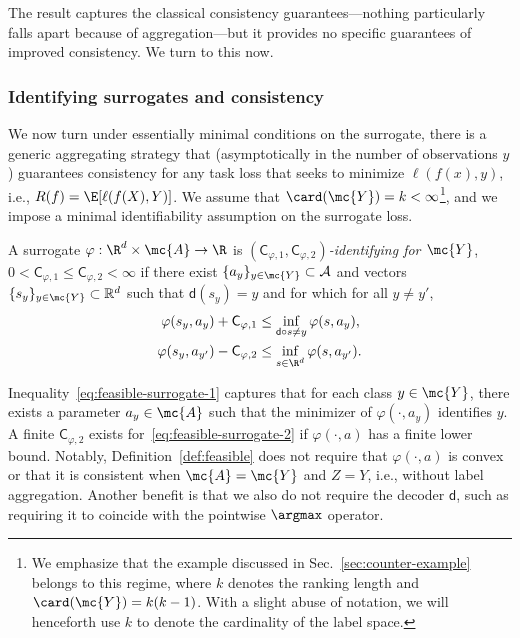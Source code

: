 \documentclass[11pt]{article}
\newcommand{\real}{\mathbb{R}} %
\newcommand{\constant}{\mathsf{C}}  %
\newcommand{\pred}{\mathsf{d}}  %
\newcommand{\tloss}{\ell}  %
\newcommand{\sloss}{\varphi}  %
\begin{document}
The result captures the classical consistency guarantees---nothing
particularly falls apart because of aggregation---but it provides no
specific guarantees of improved consistency.
%
We turn to this now.

\subsubsection{Identifying surrogates and consistency}

We now turn under essentially minimal conditions on the surrogate, there is
a generic aggregating strategy that (asymptotically in the number of
observations $y$) guarantees consistency for any task loss that seeks to
minimize $\tloss(f(x), y)$, i.e.,
$R(f) = \E[\tloss(f(X), Y)]$.
%
We assume that $\card(\mc{Y}) = k < \infty$\footnote{We emphasize that the example discussed in Sec.~\ref{sec:counter-example} belongs to this regime, where $k$ denotes the ranking length and $\card(\mc{Y}) = k(k-1)$. With a slight abuse of notation, we will henceforth use $k$ to denote the cardinality of the label space.},
and we impose a minimal identifiability assumption on the surrogate
loss.

\begin{definition}
  \label{def:feasible}
  A surrogate $\sloss : \R^d \times \mc{A} \to \R$ is
  \emph{$(\constant_{\sloss, 1}, \constant_{\sloss, 2})$-identifying
  for $\mc{Y}$},
  $0 < \constant_{\sloss,1} \le \constant_{\sloss,2} < \infty$
  if there exist
  $\{a_y\}_{y \in \mc{Y}} \subset \mathcal{A}$ and
  vectors $\{s_y\}_{y \in \mc{Y}} \subset \real^d$ such that
  $\pred(s_y) = y$ and for which for all $y \neq y'$,
  \begin{subequations}
    \begin{align}
      \sloss(s_y, a_y) + \constant_{\sloss, 1}
      & \leq \inf_{\pred \circ s \neq y} \sloss(s, a_y),
      \label{eq:feasible-surrogate-1} \\
      \sloss(s_y, a_{y'}) - \constant_{\sloss, 2}
      & \leq \inf_{s \in \R^d} \sloss(s, a_{y'}). \label{eq:feasible-surrogate-2}
    \end{align}
  \end{subequations}
\end{definition}
\noindent
Inequality~\eqref{eq:feasible-surrogate-1} captures
that for each class $y \in \mc{Y}$,
there exists a parameter $a_y \in \mc{A}$ such that the minimizer
of $\sloss(\cdot, a_y)$ identifies $y$.
%
A finite
$\constant_{\sloss, 2}$ exists for~\eqref{eq:feasible-surrogate-2}
if $\sloss(\cdot, a)$ has a finite lower bound.
%
Notably, Definition~\ref{def:feasible}
does not require that $\sloss(\cdot, a)$ is convex or that it is
consistent when $\mc{A} = \mc{Y}$ and $Z = Y$, i.e., without label
aggregation. Another benefit is that we also do not require the decoder $\pred$, such as requiring it to coincide with the pointwise $\argmax$ operator.
\end{document}
